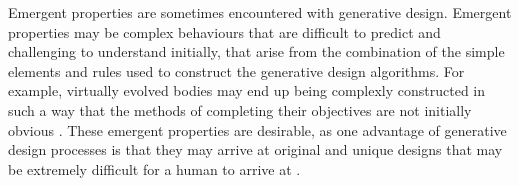 Emergent properties are sometimes encountered with generative design. Emergent properties may be complex behaviours that are difficult to predict \cite{Aiguier2008} and challenging to understand initially, that arise from the combination of the simple elements and rules used to construct the generative design algorithms. For example, virtually evolved bodies may end up being complexly constructed in such a way that the methods of completing their objectives are not initially obvious \cite{Damper2000}. These emergent properties are desirable, as one advantage of generative design processes is that they may arrive at original and unique designs that may be extremely difficult for a human to arrive at \cite{Sims1994a}. 